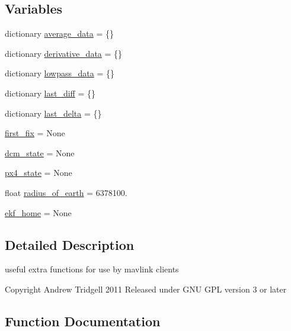 \subsection*{Variables}
\begin{DoxyCompactItemize}
\item 
dictionary \mbox{\hyperlink{namespacepymavlink_1_1mavextra_a76fcc483634240cbd986407ea04000e3}{average\+\_\+data}} = \{\}
\item 
dictionary \mbox{\hyperlink{namespacepymavlink_1_1mavextra_a3254820968ce29e97fb197680e5df9bc}{derivative\+\_\+data}} = \{\}
\item 
dictionary \mbox{\hyperlink{namespacepymavlink_1_1mavextra_a2c90308cee880c46b9082f786cba6adb}{lowpass\+\_\+data}} = \{\}
\item 
dictionary \mbox{\hyperlink{namespacepymavlink_1_1mavextra_a53b67713abd456bc6ced90ccf8603937}{last\+\_\+diff}} = \{\}
\item 
dictionary \mbox{\hyperlink{namespacepymavlink_1_1mavextra_a50e8a351722d68416745064f2c9927fb}{last\+\_\+delta}} = \{\}
\item 
\mbox{\hyperlink{namespacepymavlink_1_1mavextra_adf8ad01a6deb47c3593112e41af683d5}{first\+\_\+fix}} = None
\item 
\mbox{\hyperlink{namespacepymavlink_1_1mavextra_af3b8d2455323dd429c14e6fa95e10e12}{dcm\+\_\+state}} = None
\item 
\mbox{\hyperlink{namespacepymavlink_1_1mavextra_adf55d806751f41104a7c778b38c2d7e6}{px4\+\_\+state}} = None
\item 
float \mbox{\hyperlink{namespacepymavlink_1_1mavextra_a0d623e5b8a6a2ee5f295e0d5c14fd01b}{radius\+\_\+of\+\_\+earth}} = 6378100.
\item 
\mbox{\hyperlink{namespacepymavlink_1_1mavextra_a80175ecaee74959808255a74533fdbb5}{ekf\+\_\+home}} = None
\end{DoxyCompactItemize}


\subsection{Detailed Description}
\begin{DoxyVerb}useful extra functions for use by mavlink clients

Copyright Andrew Tridgell 2011
Released under GNU GPL version 3 or later
\end{DoxyVerb}
 

\subsection{Function Documentation}
\mbox{\label{namespacepymavlink_1_1mavextra_a769a373b481f0c8aa24565a18f141e66}} 
